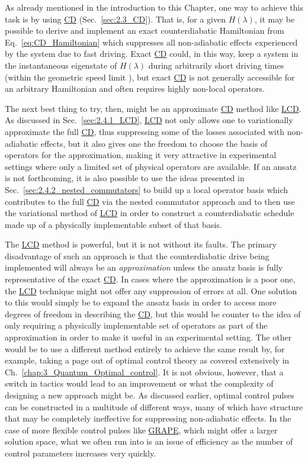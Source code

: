 \documentclass[a4paper,oneside,11pt]{book}
\newcommand{\acrref}[1]{\hyperref[acr:#1]{#1}}
\begin{document}
As already mentioned in the introduction to this Chapter, one way to achieve this task is by using \acrref{CD} (Sec.~\ref{sec:2.3_CD}). That is, for a given $H(\lambda)$, it may be possible to derive and implement an exact counterdiabatic Hamiltonian from Eq.~\ref{eq:CD_Hamiltonian} which suppresses all non-adiabatic effects experienced by the system due to fast driving. Exact \acrref{CD} could, in this way, keep a system in the instantaneous eigenstate of $H(\lambda)$ during arbitrarily short driving times (within the geometric speed limit \cite{bukov_geometric_2019}), but exact \acrref{CD} is not generally accessible for an arbitrary Hamiltonian \cite{kolodrubetz_geometry_2017} and often requires highly non-local operators. 

The next best thing to try, then, might be an approximate \acrref{CD} method like \acrref{LCD}. As discussed in Sec.~\ref{sec:2.4.1_LCD}, \acrref{LCD} not only allows one to variationally approximate the full \acrref{CD}, thus suppressing some of the losses associated with non-adiabatic effects, but it also gives one the freedom to choose the basis of operators for the approximation, making it very attractive in experimental settings where only a limited set of physical operators are available. If an ansatz is not forthcoming, it is also possible to use the ideas presented in Sec.~\ref{sec:2.4.2_nested_commutators} to build up a local operator basis which contributes to the full \acrref{CD} via the nested commutator approach \cite{geier_floquet_2021} and to then use the variational method of \acrref{LCD} in order to construct a counterdiabatic schedule made up of a physically implementable subset of that basis. 

The \acrref{LCD} method is powerful, but it is not without its faults. The primary disadvantage of such an approach is that the counterdiabatic drive being implemented will always be an \emph{approximation} unless the ansatz basis is fully representative of the exact \acrref{CD}. In cases where the approximation is a poor one, the \acrref{LCD} technique might not offer any suppression of errors at all. One solution to this would simply be to expand the ansatz basis in order to access more degrees of freedom in describing the \acrref{CD}, but this would be counter to the idea of only requiring a physically implementable set of operators as part of the approximation in order to make it useful in an experimental setting. The other would be to use a different method entirely to achieve the same result by, for example, taking a page out of optimal control theory as covered extensively in Ch.~\ref{chap:3_Quantum_Optimal_control}. It is not obvious, however, that a switch in tactics would lead to an improvement or what the complexity of designing a new approach might be. As discussed earlier, optimal control pulses can be constructed in a multitude of different ways, many of which have structure that may be completely ineffective for suppressing non-adiabatic effects. In the case of more flexible control pulses like \acrref{GRAPE}, which might offer a larger solution space, what we often run into is an issue of efficiency as the number of control parameters increases very quickly. 
\end{document}
